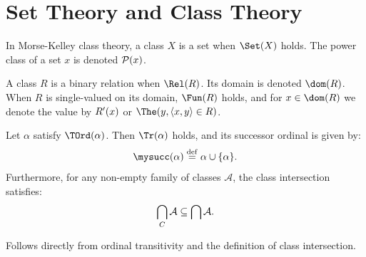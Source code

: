 \section{Set Theory and Class Theory}

\begin{definition}
In Morse-Kelley class theory, a class $X$ is a set when $\Set(X)$ holds. The power class of a set $x$ is denoted $\mathcal{P}(x)$.
\end{definition}

\begin{definition}
A class $R$ is a binary relation when $\Rel(R)$. Its domain is denoted $\dom(R)$. When $R$ is single-valued on its domain, $\Fun(R)$ holds, and for $x \in \dom(R)$ we denote the value by $R{'}(x)$ or $\The(y, \tuple{x, y} \in R)$.
\end{definition}

\begin{theorem}
Let $\alpha$ satisfy $\TOrd(\alpha)$. Then $\Tr(\alpha)$ holds, and its successor ordinal is given by:
\[
\mysucc(\alpha) \eqdef \alpha \cup \{\alpha\}.
\]
Furthermore, for any non-empty family of classes $\mathcal{A}$, the class intersection satisfies:
\[
\bigcap_{C} \mathcal{A} \subseteq \bigcap \mathcal{A}.
\]
\end{theorem}

\myprf
Follows directly from ordinal transitivity and the definition of class intersection.
\myqed

